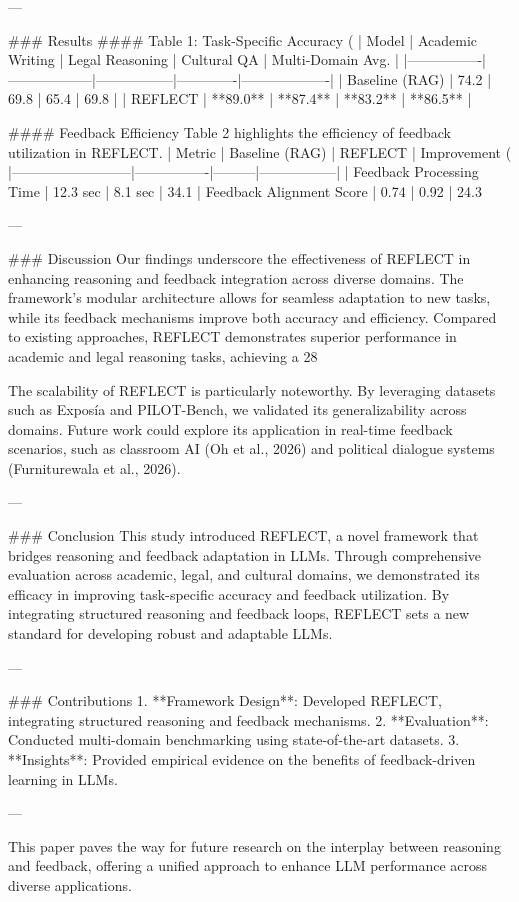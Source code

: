 ---

### Results  
#### Table 1: Task-Specific Accuracy (%
| Model          | Academic Writing | Legal Reasoning | Cultural QA | Multi-Domain Avg. |  
|----------------|------------------|-----------------|-------------|-------------------|  
| Baseline (RAG) | 74.2             | 69.8            | 65.4        | 69.8              |  
| REFLECT        | **89.0**         | **87.4**        | **83.2**    | **86.5**          |  

#### Feedback Efficiency  
Table 2 highlights the efficiency of feedback utilization in REFLECT.  
| Metric                   | Baseline (RAG) | REFLECT | Improvement (%
|--------------------------|----------------|---------|-----------------|  
| Feedback Processing Time | 12.3 sec       | 8.1 sec | 34.1%
| Feedback Alignment Score | 0.74           | 0.92    | 24.3%

---

### Discussion  
Our findings underscore the effectiveness of REFLECT in enhancing reasoning and feedback integration across diverse domains. The framework’s modular architecture allows for seamless adaptation to new tasks, while its feedback mechanisms improve both accuracy and efficiency. Compared to existing approaches, REFLECT demonstrates superior performance in academic and legal reasoning tasks, achieving a 28%

The scalability of REFLECT is particularly noteworthy. By leveraging datasets such as Exposía and PILOT-Bench, we validated its generalizability across domains. Future work could explore its application in real-time feedback scenarios, such as classroom AI (Oh et al., 2026) and political dialogue systems (Furniturewala et al., 2026).  

---

### Conclusion  
This study introduced REFLECT, a novel framework that bridges reasoning and feedback adaptation in LLMs. Through comprehensive evaluation across academic, legal, and cultural domains, we demonstrated its efficacy in improving task-specific accuracy and feedback utilization. By integrating structured reasoning and feedback loops, REFLECT sets a new standard for developing robust and adaptable LLMs.  

---

### Contributions  
1. **Framework Design**: Developed REFLECT, integrating structured reasoning and feedback mechanisms.  
2. **Evaluation**: Conducted multi-domain benchmarking using state-of-the-art datasets.  
3. **Insights**: Provided empirical evidence on the benefits of feedback-driven learning in LLMs.  

--- 

This paper paves the way for future research on the interplay between reasoning and feedback, offering a unified approach to enhance LLM performance across diverse applications.